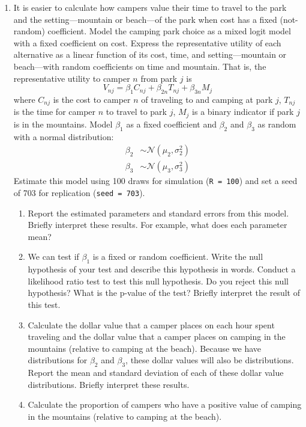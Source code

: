 \documentclass[11pt,letterpaper]{article}
\begin{document}
\begin{enumerate}[label=\alph*., leftmargin=*]
	\item It is easier to calculate how campers value their time to travel to the park and the setting---mountain or beach---of the park when cost has a fixed (not-random) coefficient. Model the camping park choice as a mixed logit model with a fixed coefficient on cost. Express the representative utility of each alternative as a linear function of its cost, time, and setting---mountain or beach---with random coefficients on time and mountain. That is, the representative utility to camper $n$ from park $j$ is
	$$V_{nj} = \beta_1 C_{nj} + \beta_{2n} T_{nj} + \beta_{3n} M_j$$
	where $C_{nj}$ is the cost to camper $n$ of traveling to and camping at park $j$, $T_{nj}$ is the time for camper $n$ to travel to park $j$, $M_j$ is a binary indicator if park $j$ is in the mountains. Model $\beta_1$ as a fixed coefficient and $\beta_2$ and $\beta_3$ as random with a normal distribution:
	\begin{align*}
		\beta_2 & \sim \mathcal{N}(\mu_2, \sigma_2^2) \\
		\beta_3 & \sim \mathcal{N}(\mu_3, \sigma_3^2)
	\end{align*}
	Estimate this model using 100 draws for simulation (\texttt{R = 100}) and set a seed of 703 for replication (\texttt{seed = 703}).

	\begin{enumerate}[label=\roman*.]
		\item Report the estimated parameters and standard errors from this model. Briefly interpret these results. For example, what does each parameter mean?

		\item We can test if $\beta_1$ is a fixed or random coefficient. Write the null hypothesis of your test and describe this hypothesis in words. Conduct a likelihood ratio test to test this null hypothesis. Do you reject this null hypothesis? What is the p-value of the test? Briefly interpret the result of this test.

		\item Calculate the dollar value that a camper places on each hour spent traveling and the dollar value that a camper places on camping in the mountains (relative to camping at the beach). Because we have distributions for $\beta_2$ and $\beta_3$, these dollar values will also be distributions. Report the mean and standard deviation of each of these dollar value distributions. Briefly interpret these results.

		\item Calculate the proportion of campers who have a positive value of camping in the mountains (relative to camping at the beach).
	\end{enumerate}


\end{enumerate}
\end{document}
